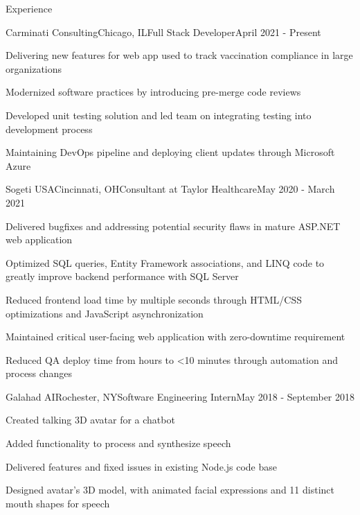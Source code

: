 \documentclass{resume} %
\begin{document}

\begin{rSection}{Experience}

\begin{rSubsection}{Carminati Consulting}{Chicago, IL}{Full Stack Developer}{April 2021 - Present}
\item Delivering new features for web app used to track vaccination compliance in large organizations
\item Modernized software practices by introducing pre-merge code reviews
\item Developed unit testing solution and led team on integrating testing into development process
\item Maintaining DevOps pipeline and deploying client updates through Microsoft Azure
\end{rSubsection}


\begin{rSubsection}{Sogeti USA}{Cincinnati, OH}{Consultant at Taylor Healthcare}{May 2020 - March 2021}
\item Delivered bugfixes and addressing potential security flaws in mature ASP.NET web application
\item Optimized SQL queries, Entity Framework associations, and LINQ code to greatly improve backend performance with SQL Server
\item Reduced frontend load time by multiple seconds through HTML/CSS optimizations and JavaScript asynchronization
\item Maintained critical user-facing web application with zero-downtime requirement
\item Reduced QA deploy time from hours to <10 minutes through automation and process changes
\end{rSubsection}


\begin{rSubsection}{Galahad AI}{Rochester, NY}{Software Engineering Intern}{May 2018 - September 2018}
\item Created talking 3D avatar for a chatbot
\item Added functionality to process and synthesize speech
\item Delivered features and fixed issues in existing Node.js code base
\item Designed avatar’s 3D model, with animated facial expressions and 11 distinct mouth shapes for speech
\end{rSubsection}


\end{rSection}
\end{document}
